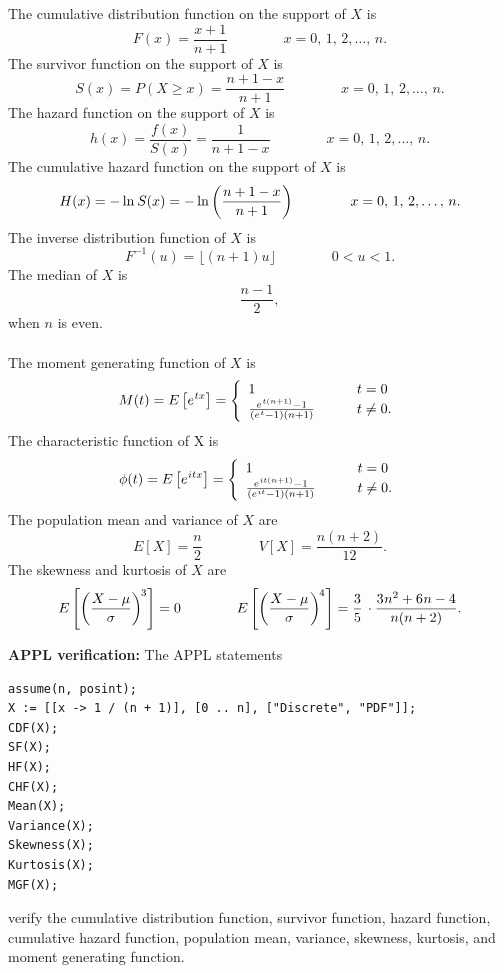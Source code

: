 \documentclass[12pt,fullpage]{article}
\begin{document}
\noindent
The cumulative distribution function on
the support of $X$ is
$$
F(x) = \frac{x + 1}{n + 1} \qquad \qquad x = 0,\, 1,\, 2, \ldots,\,n.
$$
The survivor function on the support of $X$ is
$$
S(x) = P(X \ge x) = \frac{n + 1 - x}{n + 1}\qquad \qquad x = 0,\, 1,\, 2, \ldots,\,n.
$$
The hazard function on the support of $X$ is
$$
h(x) = \frac{f(x)} {S(x)}= \frac{1}{n + 1 - x} \qquad \qquad x = 0,\, 1,\, 2, \ldots,\,n.
$$
The cumulative hazard function on the support of $X$ is
$$
H(x) =  -\ln  \kern 0.04em S(x)= -\ln \left( \frac{n + 1 - x}{n + 1} \right) \qquad \qquad x = 0,\, 1,\, 2, \ldots,\,n.
$$
The inverse distribution function of $X$ is
$$
F^{-1}(u) = \lfloor (n + 1) u \rfloor \qquad \qquad 0 < u < 1.
$$
The median of $X$ is
$$
\frac{n-1}{2},
$$
when $n$ is even.\\
\\
The moment generating function of $X$ is 
$$
M(t) = E \left[e ^  {\kern 0.04em tx}\right] = \left\{ \begin{array}{ll}
       1 & \qquad t = 0 \\
       \frac{e ^ { {\kern 0.04em t (n + 1)}} - 1}{\left(e ^  {\kern 0.04em t} - 1 \right)(n + 1)} & \qquad t  \ne 0.
       \end{array} \right. 
$$
The characteristic function of X is
$$
\phi(t) = E \left[e ^  {\kern 0.04em itx}\right] = \left\{ \begin{array}{ll}
       1 & \qquad t = 0 \\
       \frac{e ^ { {\kern 0.04em it (n + 1)}} - 1}{\left(e ^  {\kern 0.04em it} - 1 \right)(n + 1)} & \qquad t \ne 0.
       \end{array} \right. 
$$
The population mean and variance of $X$ are
$$
E[X]=\frac{n}{2}\qquad \qquad
V[X]=\frac{n(n+2)}{12}.
$$
The skewness and kurtosis of $X$ are
$$
E\left[\left(\frac{X - \mu}{\sigma}\right) ^ {\kern -0.08 em 3} \right] = 0 \qquad \qquad
E\left[\left(\frac{X - \mu}{\sigma}\right) ^ {\kern -0.08 em 4} \right] = \frac{3}{5}\,\cdot \frac{3 \kern 0.04em n ^ 2 + 6 \kern 0.04em n - 4}{n (n + 2)}.
$$
\vspace{0.1in}


\noindent
{\bf APPL verification:}
The APPL statements
\begin{verbatim}
assume(n, posint);
X := [[x -> 1 / (n + 1)], [0 .. n], ["Discrete", "PDF"]];
CDF(X);
SF(X);
HF(X);
CHF(X);
Mean(X);
Variance(X);
Skewness(X);
Kurtosis(X);
MGF(X);
\end{verbatim}
verify the cumulative distribution function, survivor function, hazard function, cumulative hazard function, population mean, variance, skewness, kurtosis, and moment generating function.
\end{document}
